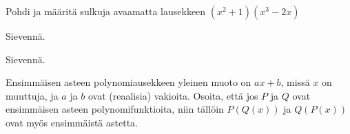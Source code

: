 \begin{tehtavasivu}
\begin{tehtava}
    Pohdi ja määritä sulkuja avaamatta lausekkeen $(x^2+1)(x^3-2x)$
    \begin{alakohdat}
    \end{alakohdat}
    \begin{vastaus}
        \begin{alakohdat}
        \end{alakohdat}
    \end{vastaus}
\end{tehtava}

\begin{tehtava}
    Sievennä.
    \begin{alakohdat}
    \end{alakohdat}
    \begin{vastaus}
        \begin{alakohdat}
        \end{alakohdat}
    \end{vastaus}
\end{tehtava}


\begin{tehtava}
    Sievennä.
    \begin{alakohdat}
    \end{alakohdat}
    \begin{vastaus}
        \begin{alakohdat}
        \end{alakohdat}
    \end{vastaus}
\end{tehtava}


\begin{tehtava}
Ensimmäisen asteen polynomiausekkeen yleinen muoto on $ax+b$, missä $x$ on muuttuja, ja $a$ ja $b$ ovat (reaalisia) vakioita. Osoita, että jos $P$ ja $Q$ ovat ensimmäisen asteen polynomifunktioita, niin tällöin $P(Q(x))$ ja $Q(P(x))$ ovat myös ensimmäistä astetta.


\end{tehtava}
\end{tehtavasivu}
